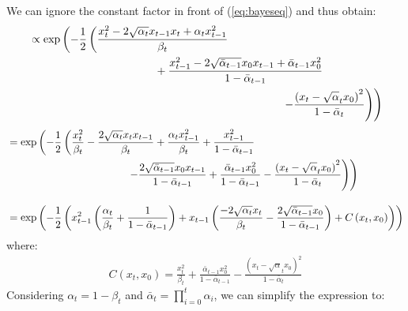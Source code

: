 \documentclass[twoside]{article}
\numberwithin{equation}{section}
\numberwithin{figure}{section}
\begin{document}
We can ignore the constant factor in front of (\ref{eq:bayeseq}) and thus obtain:
\begin{align}
  &\propto \exp\left(- \frac{1}{2} \left(\frac{x_t^2 - 2 \sqrt{\alpha_t} x_{t-1} x_t + \alpha_t x_{t-1}^2}{\beta_t} \right. \right. \\
  & \hspace{4cm} + \frac{x_{t-1}^2 - 2 \sqrt{\bar{\alpha}_{t-1}} x_0 x_{t-1} + \bar{\alpha}_{t-1} x_0^2}{ 1 - \bar{\alpha}_{t-1}}  \notag \\
  & \left. \left. \hspace{8cm} - \frac{\left(x_t - \sqrt{\alpha}_t x_0\right)^2}{1 - \bar{\alpha}_{t}}\right) \right) \notag
\end{align}
\begin{align}
  &= \exp\left(- \frac{1}{2} \left(\frac{x_t^2}{\beta_t} - \frac{2 \sqrt{\alpha_t} x_t x_{t-1}}{\beta_t} + \frac{\alpha_t x_{t-1}^2}{\beta_t} + \frac{x_{t-1}^2}{1 - \bar{\alpha}_{t-1}} \right. \right. \\
  & \left. \left. \hspace{4cm}  - \frac{2 \sqrt{\bar{\alpha}_{t-1}} x_0 x_{t-1}}{1 - \bar{\alpha}_{t-1}} + \frac{\bar{\alpha}_{t-1} x_0^2}{1 - \bar{\alpha}_{t-1}} - \frac{\left(x_t - \sqrt{\alpha}_t x_0\right)^2}{1 - \bar{\alpha}_{t}}\right) \right) \notag \\[10pt]
  &= \exp\left(- \frac{1}{2} \left(x_{t-1}^2 \left(\frac{\alpha_t}{\beta_t} + \frac{1}{1 - \bar{\alpha}_{t-1}}\right) + x_{t-1} \left(\frac{-2 \sqrt{\alpha_t} x_t}{\beta_t} - \frac{2 \sqrt{\bar{\alpha}_{t-1}} x_0 }{1 - \bar{\alpha}_{t-1}}\right) + C\left(x_t, x_0\right)\right) \right) 
\end{align}
where:
\begin{gather}
  C\left(x_t, x_0\right) = \frac{x_t^2}{\beta_t} + \frac{\bar{\alpha}_{t-1} x_0^2}{1 - \bar{\alpha}_{t-1}} - \frac{\left(x_t - \sqrt{\alpha}_t x_0\right)^2}{1 - \bar{\alpha}_{t}}
\end{gather}
Considering $\alpha_t = 1 - \beta_t$ and $\bar{\alpha}_t = \prod_{i=0}^{t}{\alpha_i}$, we can simplify the expression to:
\end{document}
